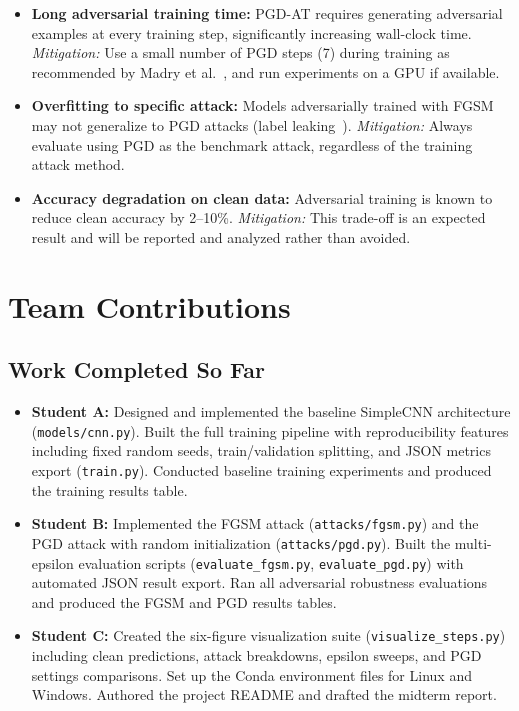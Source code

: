 \documentclass[conference]{IEEEtran}
\begin{document}
\begin{itemize}
    \item \textbf{Long adversarial training time:} PGD-AT requires generating adversarial examples at every training step, significantly increasing wall-clock time. \emph{Mitigation:} Use a small number of PGD steps (7) during training as recommended by Madry et al.~\cite{madry2018pgd}, and run experiments on a GPU if available.

    \item \textbf{Overfitting to specific attack:} Models adversarially trained with FGSM may not generalize to PGD attacks (label leaking~\cite{kurakin2017scale}). \emph{Mitigation:} Always evaluate using PGD as the benchmark attack, regardless of the training attack method.

    \item \textbf{Accuracy degradation on clean data:} Adversarial training is known to reduce clean accuracy by 2--10\%. \emph{Mitigation:} This trade-off is an expected result and will be reported and analyzed rather than avoided.
\end{itemize}

\section{Team Contributions}

\subsection*{Work Completed So Far}
\begin{itemize}
    \item \textbf{Student A:} Designed and implemented the baseline SimpleCNN architecture (\texttt{models/cnn.py}). Built the full training pipeline with reproducibility features including fixed random seeds, train/validation splitting, and JSON metrics export (\texttt{train.py}). Conducted baseline training experiments and produced the training results table.

    \item \textbf{Student B:} Implemented the FGSM attack (\texttt{attacks/fgsm.py}) and the PGD attack with random initialization (\texttt{attacks/pgd.py}). Built the multi-epsilon evaluation scripts (\texttt{evaluate\_fgsm.py}, \texttt{evaluate\_pgd.py}) with automated JSON result export. Ran all adversarial robustness evaluations and produced the FGSM and PGD results tables.

    \item \textbf{Student C:} Created the six-figure visualization suite (\texttt{visualize\_steps.py}) including clean predictions, attack breakdowns, epsilon sweeps, and PGD settings comparisons. Set up the Conda environment files for Linux and Windows. Authored the project README and drafted the midterm report.
\end{itemize}
\end{document}
